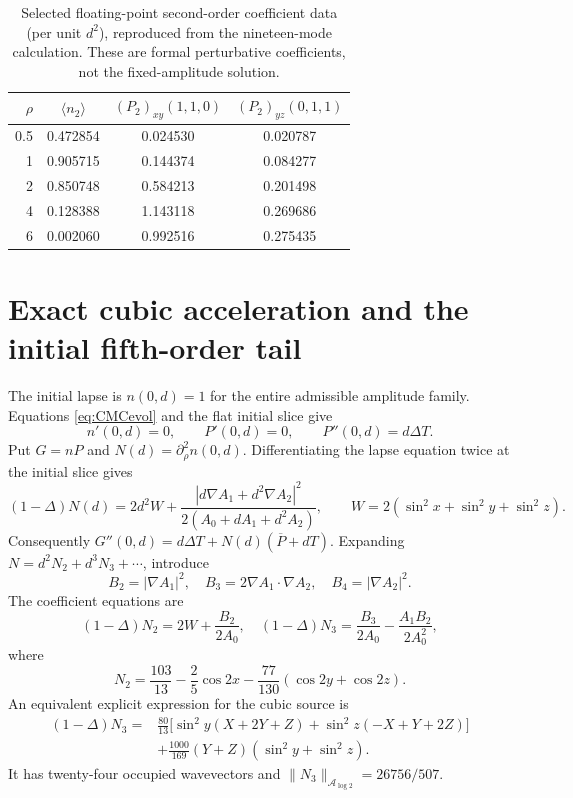 \documentclass[11pt,a4paper]{article}
\theoremstyle{remark}
\newcommand{\A}{\mathcal A_{\log 2}}
\newcommand{\pbar}{\overline P}
\begin{document}
\begin{table}[tbp]
\centering
\caption{Selected floating-point second-order coefficient data (per unit $d^2$), reproduced from the nineteen-mode calculation. These are formal perturbative coefficients, not the fixed-amplitude solution.}
\begin{tabular}{@{}rccc@{}}
\toprule
$\rho$ & $\langle n_2\rangle$ & $(P_2)_{xy}(1,1,0)$ & $(P_2)_{yz}(0,1,1)$\\
\midrule
0.5 & 0.472854 & 0.024530 & 0.020787\\
1 & 0.905715 & 0.144374 & 0.084277\\
2 & 0.850748 & 0.584213 & 0.201498\\
4 & 0.128388 & 1.143118 & 0.269686\\
6 & 0.002060 & 0.992516 & 0.275435\\
\bottomrule
\end{tabular}
\label{tab:quadratic}
\end{table}

\section{Exact cubic acceleration and the initial fifth-order tail}
The initial lapse is $n(0,d)=1$ for the entire admissible amplitude family. Equations \eqref{eq:CMCevol} and the flat initial slice give
\[
n'(0,d)=0,\qquad P'(0,d)=0,\qquad P''(0,d)=d\Delta T.
\]
Put $G=nP$ and $N(d)=\partial_\rho^2n(0,d)$. Differentiating the lapse equation twice at the initial slice gives
\begin{equation}\label{eq:lapse-acc}
(1-\Delta)N(d)=2d^2W+
\frac{|d\nabla A_1+d^2\nabla A_2|^2}{2(A_0+dA_1+d^2A_2)},
\qquad W=2(\sin^2x+\sin^2y+\sin^2z).
\end{equation}
Consequently $G''(0,d)=d\Delta T+N(d)(\pbar+dT)$. Expanding $N=d^2N_2+d^3N_3+\cdots$, introduce
\[
B_2=|\nabla A_1|^2,\quad B_3=2\nabla A_1\cdot\nabla A_2,
\quad B_4=|\nabla A_2|^2.
\]
The coefficient equations are
\begin{equation}\label{eq:N23}
(1-\Delta)N_2=2W+\frac{B_2}{2A_0},\quad
(1-\Delta)N_3=\frac{B_3}{2A_0}-\frac{A_1B_2}{2A_0^2},
\end{equation}
where
\begin{equation}\label{eq:N2}
N_2=\frac{103}{13}-\frac25\cos2x-\frac{77}{130}(\cos2y+\cos2z).
\end{equation}
An equivalent explicit expression for the cubic source is
\begin{align}\label{eq:N3source}
(1-\Delta)N_3={}&\frac{80}{13}\bigl[\sin^2y(X+2Y+Z)
+\sin^2z(-X+Y+2Z)\bigr]\\
&+\frac{1000}{169}(Y+Z)(\sin^2y+\sin^2z).\nonumber
\end{align}
It has twenty-four occupied wavevectors and $\|N_3\|_{\A}=26756/507$.
\end{document}

